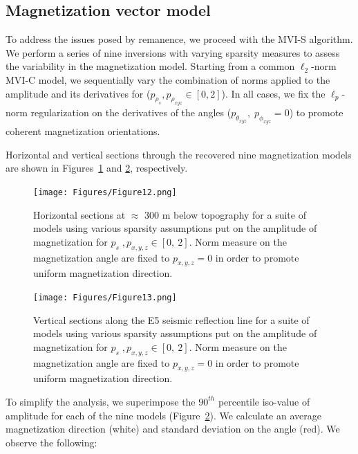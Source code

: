 \documentclass[paper]{geophysics}
\begin{document}
\subsection{Magnetization vector model}
To address the issues posed by remanence, we proceed with the MVI-S algorithm.
We perform a series of nine inversions with varying sparsity measures to assess the variability in the magnetization model. Starting from a common $\ell_2$-norm MVI-C model, we sequentially vary the combination of norms applied to the amplitude and its derivatives for ($p_{\rho_s}, p_{\rho_{xyz}} \in [0, 2]$). In all cases, we fix the $\ell_p$-norm regularization on the derivatives of the angles ($p_{\theta_{xyz}},\;p_{\phi_{xyz}} =0$) to promote coherent magnetization orientations.

Horizontal and vertical sections through the recovered nine magnetization models are shown in Figures~\ref{MVIS_Hsections} and \ref{MVIS_Vsections}, respectively.

\begin{figure}[p!]
\texttt{[image: Figures/Figure12.png]}
\caption{Horizontal sections at $\approx$ 300 m below topography for a suite of models using various sparsity assumptions put on the amplitude of magnetization for $p_s\;, p_{x,y,z} \in [0,\: 2]$. Norm measure on the magnetization angle are fixed to $p_{x,y,z}=0$ in order to promote uniform magnetization direction.}
\label{MVIS_Hsections}
\end{figure}
	
\begin{figure}[p!]
\texttt{[image: Figures/Figure13.png]}
\caption{Vertical sections along the E5 seismic reflection line for a suite of models using various sparsity assumptions put on the amplitude of magnetization for $p_s\;, p_{x,y,z} \in [0,\: 2]$. Norm measure on the magnetization angle are fixed to $p_{x,y,z}=0$ in order to promote uniform magnetization direction.}
\label{MVIS_Vsections}
\end{figure}

To simplify the analysis, we superimpose the $90^{th}$ percentile iso-value of amplitude for each of the nine models (Figure~\ref{MVIS_Vsections}). We calculate an average magnetization direction (white) and standard deviation on the angle (red). We observe the following:	
\end{document}
